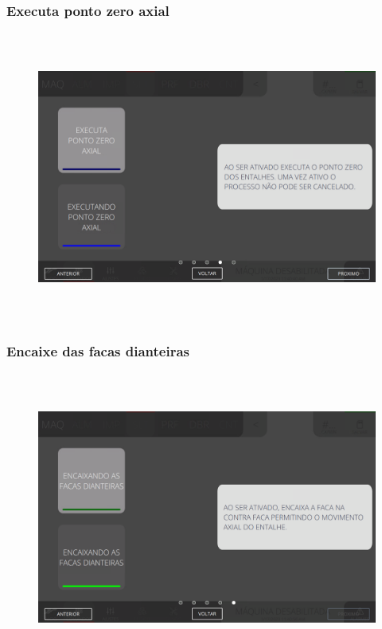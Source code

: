 \newpage
\thispagestyle{fancy}
\vspace*{40 pt}
\subsubsection{\small{Executa ponto zero axial}}\label{telaComandoSlotterExecutaPontoZeroAxial}
\vspace*{\fill}
\begin{figure}[h]
  \centering
  \includegraphics[width=576px,height=360px]{src/imagesFlexo/05-slotter/commands/e-4.png}
\end{figure}
\vspace*{\fill}

\newpage
\thispagestyle{fancy}
\vspace*{40 pt}
\subsubsection{\small{Encaixe das facas dianteiras}}\label{telaComandoSlotterEncaixeDasFacasDianteiras}
\vspace*{\fill}
\begin{figure}[h]
  \centering
  \includegraphics[width=576px,height=360px]{src/imagesFlexo/05-slotter/commands/e-5.png}
\end{figure}
\vspace*{\fill}

